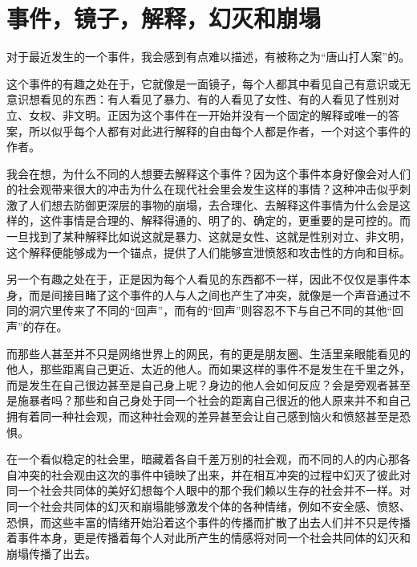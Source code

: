 \chapter{事件，镜子，解释，幻灭和崩塌}




对于最近发生的一个事件，我会感到有点难以描述，有被称之为“唐山打人案”的。

这个事件的有趣之处在于，它就像是一面镜子，每个人都其中看见自己有意识或无意识想看见的东西：有人看见了暴力、有的人看见了女性、有的人看见了性别对立、女权、非文明。正因为这个事件在一开始并没有一个固定的解释或唯一的答案，所以似乎每个人都有对此进行解释的自由\pozhehao{}每个人都是作者，一个对这个事件的作者。

我会在想，为什么不同的人想要去解释这个事件？因为这个事件本身好像会对人们的社会观带来很大的冲击\pozhehao{}为什么在现代社会里会发生这样的事情？这种冲击似乎刺激了人们想去防御更深层的事物的崩塌，去合理化、去解释这件事情为什么会是这样的，这件事情是合理的、解释得通的、明了的、确定的，更重要的是\pozhehao{}可控的。而一旦找到了某种解释\pozhehao{}比如说这就是暴力、这就是女性、这就是性别对立、非文明，这个解释便能够成为一个锚点，提供了人们能够宣泄愤怒和攻击性的方向和目标。

另一个有趣之处在于，正是因为每个人看见的东西都不一样，因此不仅仅是事件本身，而是间接目睹了这个事件的人与人之间也产生了冲突，就像是一个声音通过不同的洞穴里传来了不同的“回声”，而有的“回声”则容忍不下与自己不同的其他“回声”的存在。

而那些人甚至并不只是网络世界上的网民，有的更是朋友圈、生活里亲眼能看见的他人，那些距离自己更近、太近的他人。而如果这样的事件不是发生在千里之外，而是发生在自己很边甚至是自己身上呢？身边的他人会如何反应？会是旁观者甚至是施暴者吗？那些和自己身处于同一个社会的距离自己很近的他人原来并不和自己拥有着同一种社会观，而这种社会观的差异甚至会让自己感到恼火和愤怒甚至是恐惧。

在一个看似稳定的社会里，暗藏着各自千差万别的社会观，而不同的人的内心那各自冲突的社会观由这次的事件中镜映了出来，并在相互冲突的过程中幻灭了彼此对同一个社会共同体的美好幻想\pozhehao{}每个人眼中的那个我们赖以生存的社会并不一样。对同一个社会共同体的幻灭和崩塌能够激发个体的各种情绪，例如不安全感、愤怒、恐惧，而这些丰富的情绪开始沿着这个事件的传播而扩散了出去\pozhehao{}人们并不只是传播着事件本身，更是传播着每个人对此所产生的情感\pozhehao{}将对同一个社会共同体的幻灭和崩塌传播了出去。

